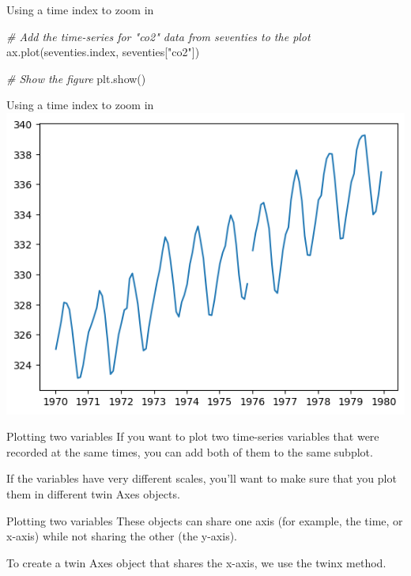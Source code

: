 \documentclass[
  ignorenonframetext,
]{beamer}
\newenvironment{Shaded}{\begin{snugshade}}{\end{snugshade}}
\newcommand{\CommentTok}[1]{\textcolor[rgb]{0.56,0.35,0.01}{\textit{#1}}}
\newcommand{\NormalTok}[1]{#1}
\newcommand{\StringTok}[1]{\textcolor[rgb]{0.31,0.60,0.02}{#1}}
\begin{document}
\begin{frame}[fragile]{Using a time index to zoom in}
\label{using-a-time-index-to-zoom-in-3}

\begin{Shaded}
\begin{Highlighting}[]
\CommentTok{\# Add the time{-}series for "co2" data from seventies to the plot}
\NormalTok{ax.plot(seventies.index, seventies[}\StringTok{"co2"}\NormalTok{])}

\CommentTok{\# Show the figure}
\NormalTok{plt.show()}
\end{Highlighting}
\end{Shaded}
\end{frame}

\begin{frame}{Using a time index to zoom in}
\label{using-a-time-index-to-zoom-in-4}
\includegraphics{../images/im234.png}
\end{frame}

\begin{frame}{Plotting two variables}
\label{plotting-two-variables}
If you want to plot two time-series variables that were recorded at the
same times, you can add both of them to the same subplot.

If the variables have very different scales, you'll want to make sure
that you plot them in different twin Axes objects.
\end{frame}

\begin{frame}{Plotting two variables}
\label{plotting-two-variables-1}
These objects can share one axis (for example, the time, or x-axis)
while not sharing the other (the y-axis).

To create a twin Axes object that shares the x-axis, we use the twinx
method.
\end{frame}
\end{document}
